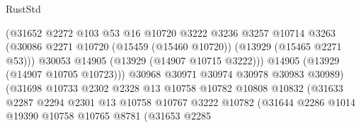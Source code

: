 \begin{lexlean}{RustStd}
\begin{coremodule}
                                        (@31652
                                          @2272
                                          @103
                                          @53
                                          @16
                                          @10720
                                          @3222
                                          @3236
                                          @3257
                                          @10714
                                          @3263
                                          (@30086
                                            @2271
                                            @10720
                                            (@15459 (@15460 @10720))
                                            (@13929 (@15465 @2271 @53)))
                                          @30053
                                          @14905
                                          (@13929 (@14907 @10715 @3222)))
                                        @14905
                                        (@13929 (@14907 @10705 @10723)))
                                      @30968
                                      @30971
                                      @30974
                                      @30978
                                      @30983
                                      @30989)
                                    (@31698
                                      @10733
                                      @2302
                                      @2328
                                      @13
                                      @10758
                                      @10782
                                      @10808
                                      @10832
                                      (@31633
                                        @2287
                                        @2294
                                        @2301
                                        @13
                                        @10758
                                        @10767
                                        @3222
                                        @10782
                                        (@31644
                                          @2286
                                          @1014
                                          @19390
                                          @10758
                                          @10765
                                          @8781
                                          (@31653
                                            @2285

\end{coremodule}
\end{lexlean}
